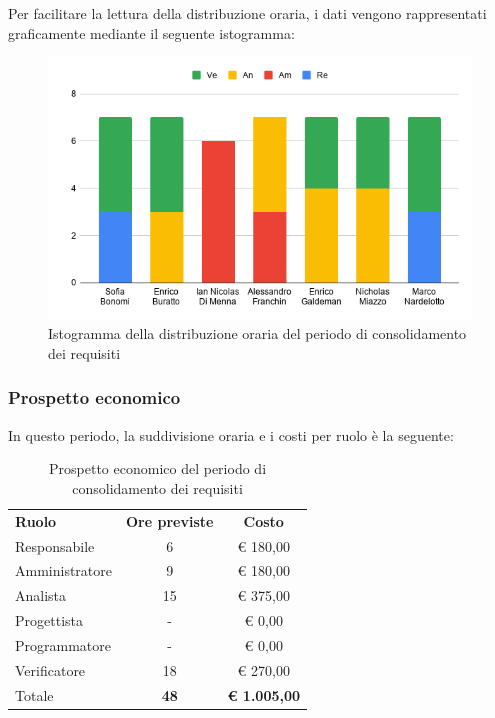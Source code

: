 \documentclass[../piano-di-progetto.tex]{subfiles}
\begin{document}
  Per facilitare la lettura della distribuzione oraria, i dati vengono rappresentati graficamente mediante il seguente istogramma:
  \begin{figure}[H]
    \centering
    \includegraphics[width=12cm]{img/ore-consolidamento.png}
    \caption{Istogramma della distribuzione oraria del periodo di consolidamento dei requisiti}
    \label{fig:ore-componente-consolidamento}
  \end{figure}

  \subsubsection{Prospetto economico}
  In questo periodo, la suddivisione oraria e i costi per ruolo è la seguente:

  \begin{table}[H]
    \centering
    \begin{tabular}{lcc}
      \rowcolor{lightgray}

      \rowcolor{lightgray}
      \textbf{Ruolo}  & \textbf{Ore previste} & \textbf{Costo}  \\
      Responsabile   & 6            & € 180,00   \\
      Amministratore & 9            & € 180,00   \\
      Analista       & 15           & € 375,00   \\
      Progettista    & -            & € 0,00     \\
      Programmatore  & -            & € 0,00     \\
      Verificatore   & 18           & € 270,00   \\
      Totale         & \textbf{48}           & \textbf{€ 1.005,00}
    \end{tabular}
    \caption{Prospetto economico del periodo di consolidamento dei requisiti}
  \end{table}
\end{document}
